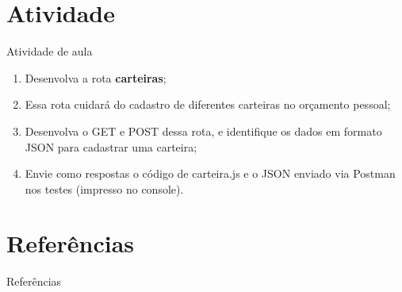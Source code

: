 \documentclass{beamer}
\begin{document}
  \section{Atividade}
  \begin{frame}{Atividade de aula}
   \begin{enumerate}
     \item Desenvolva a rota \textbf{carteiras};
     \item Essa rota cuidará do cadastro de diferentes carteiras no orçamento pessoal;
     \item Desenvolva o GET  e POST dessa rota, e identifique os dados em formato JSON para cadastrar uma carteira; 
     \item Envie como respostas o código de carteira.js e o JSON enviado via Postman nos testes (impresso no console).
   \end{enumerate}
  \end{frame}

\section{Referências}
\begin{frame}{Referências}%
\small
\begin{center}
\tiny


\end{center}
\end{frame}
  
\end{document}
